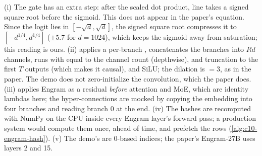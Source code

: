 \begin{implnote}[title={In the code: differences between the demo and the paper}]
(i) The gate has an extra step: after the scaled dot product, line
 takes a signed square root before the
sigmoid. This does not appear in the paper's equation. Since the logit lies in
$[-\sqrt{d}, \sqrt{d}]$, the signed square root compresses it to $[-d^{1/4}, d^{1/4}]$ ($\pm 5.7$
for $d = 1024$), which keeps the sigmoid away from saturation; this reading is ours.
(ii)  applies a per-branch , concatenates the branches into
$R d$ channels, runs  with  equal to the channel count (depthwise),
 and truncation to the first $T$ outputs (which makes it
causal), and SiLU; the dilation is  $= 3$, as in the paper. The demo does not
zero-initialize the convolution, which the paper does.
(iii)  applies Engram as a residual \emph{before} attention and MoE, which
are identity lambdas here; the hyper-connections are mocked by copying the embedding into four
branches and reading branch 0 at the end. (iv) The hashes are recomputed with NumPy on the CPU
inside every Engram layer's forward pass; a production system would compute them once, ahead of
time, and prefetch the rows (\cref{alg:c10-engram-hash}). (v) The demo's 
are 0-based indices; the paper's Engram-27B uses layers 2 and 15.
\end{implnote}


